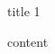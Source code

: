 \documentclass[10pt,final,hyphenatedtitles]{papertex}
\begin{document}
    \begin{news}{3}
    {title}
    {}
    {}
    {1}

        \noindent{} content
    \end{news}

    \newssep
\end{document}
